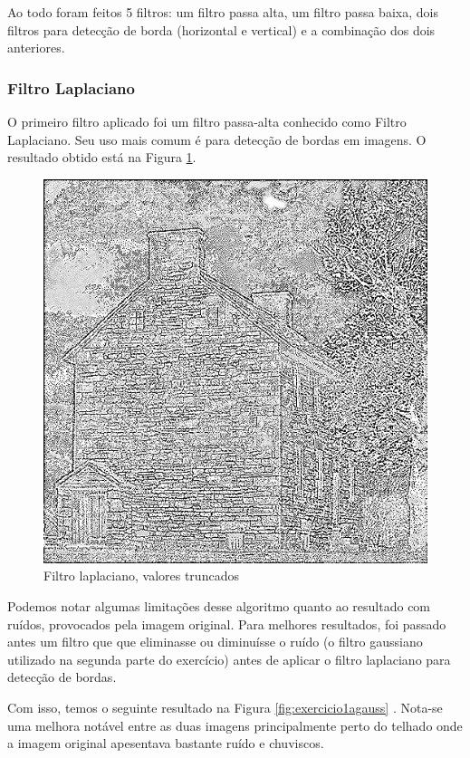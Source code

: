 \documentclass{article}
\begin{document}
Ao todo foram feitos 5 filtros: um filtro passa alta, um filtro passa baixa, dois filtros para detecção de borda (horizontal e vertical) e a combinação dos dois anteriores.

\subsubsection{Filtro Laplaciano}

O primeiro filtro aplicado foi um filtro passa-alta conhecido como Filtro Laplaciano. Seu uso mais comum é para detecção de bordas em imagens. O resultado obtido está na Figura \ref{fig:exercicio1a}.

\begin{figure}[h!]
    \includegraphics[width=\linewidth]{results/exercicio1aclipada.png}
    \caption{Filtro laplaciano, valores truncados}
    \label{fig:exercicio1a}
\end{figure}

Podemos notar algumas limitações desse algoritmo quanto ao resultado com ruídos, provocados pela imagem original. Para melhores resultados, foi passado antes um filtro que que eliminasse ou diminuísse o ruído (o filtro gaussiano utilizado na segunda parte do exercício) antes de aplicar o filtro laplaciano para detecção de bordas. 

Com isso, temos o seguinte resultado na Figura \ref{fig:exercicio1agauss} . Nota-se uma melhora notável entre as duas imagens principalmente perto do telhado onde a imagem original apesentava bastante ruído e chuviscos.
\end{document}
